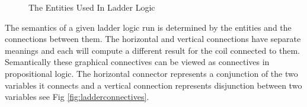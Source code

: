 \medskip

\begin{figure}[h!]
 \begin{center}
\end{center}
\label{fig:pelicanladder}
\caption{The Entities Used In Ladder Logic}

\end{figure}

\medskip

The semantics of a given ladder logic run is determined by the entities and the connections between them.  The horizontal and vertical connections have separate meanings and each will compute a different result for the coil connected to them.
Semantically these graphical connectives can be viewed as connectives in propositional logic. The horizontal connector represents a conjunction of the two variables it connects and a vertical connection represents disjunction between two variables see Fig \ref{fig:ladderconnectives}.


\begin{comment}
A Ladder logic rung is built using these entities and connections between
them. The shapes of the connections between the contacts determines how the
value of the coil is computed from them. Using propositional logic for comparison,  
a horizontal connection between two contacts represents logical conjunction
and a vertical connection between two contacts represents logical
disjunction see Figure \ref{fig:ladderconnectives}. 
\end{comment}

\medskip

